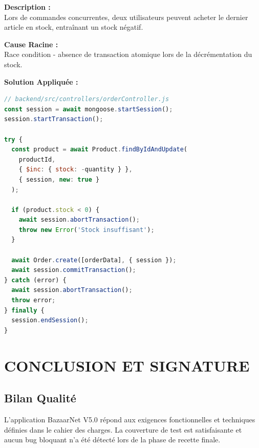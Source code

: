 \documentclass[12pt,a4paper]{article}
\begin{document}
\vspace{0.5cm}
\textbf{Description :} \\
Lors de commandes concurrentes, deux utilisateurs peuvent acheter le dernier article en stock, entraînant un stock négatif.

\vspace{0.5cm}
\textbf{Cause Racine :} \\
Race condition - absence de transaction atomique lors de la décrémentation du stock.

\vspace{0.5cm}
\textbf{Solution Appliquée :}
\begin{lstlisting}[language=JavaScript]
// backend/src/controllers/orderController.js
const session = await mongoose.startSession();
session.startTransaction();

try {
  const product = await Product.findByIdAndUpdate(
    productId,
    { $inc: { stock: -quantity } },
    { session, new: true }
  );
  
  if (product.stock < 0) {
    await session.abortTransaction();
    throw new Error('Stock insuffisant');
  }
  
  await Order.create([orderData], { session });
  await session.commitTransaction();
} catch (error) {
  await session.abortTransaction();
  throw error;
} finally {
  session.endSession();
}
\end{lstlisting}

\section{CONCLUSION ET SIGNATURE}

\subsection{Bilan Qualité}
L'application BazaarNet V5.0 répond aux exigences fonctionnelles et techniques définies dans le cahier des charges. La couverture de test est satisfaisante et aucun bug bloquant n'a été détecté lors de la phase de recette finale.
\end{document}
